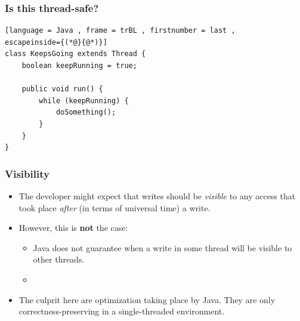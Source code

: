 \documentclass[xcolor={dvipsnames,svgnames},aspectratio=169]{beamer}
\begin{document}
\begin{frame}[fragile]
  \frametitle{Is this thread-safe?}

\begin{lstlisting}[language = Java , frame = trBL , firstnumber = last ,
escapeinside={(*@}{@*)}]
class KeepsGoing extends Thread {
    boolean keepRunning = true;

    public void run() {
        while (keepRunning) {
            doSomething();
        }
    }
}
\end{lstlisting}




\end{frame}

\begin{frame}[fragile]
  \frametitle{Visibility}

  \begin{itemize}
  \item[\faBook] The developer might expect that writes should be
    \emph{visible} to any access that took place \emph{after} (in terms of
    universal time) a write.
  \item[\faUserInjured] However, this is \textbf{not} the case:
    \begin{itemize}
    \item[\faBook] Java does not guarantee when a write in some thread will be
      visible to other threads.
    \item[\faBook] 
    \end{itemize}
  \item[\faUserInjured] The culprit here are optimization taking place by Java.
    They are only correctness-preserving in a single-threaded environment.
  \end{itemize}
\end{frame}
\end{document}
